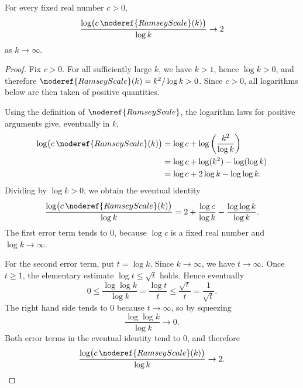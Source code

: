 \begin{helper}
For every fixed real number \(c>0\),
\[
\frac{\log\bigl(c\,\noderef{RamseyScale}(k)\bigr)}{\log k}\to 2
\]
as \(k\to\infty\).
\end{helper}
\begin{proof}
Fix \(c>0\).  For all sufficiently large \(k\), we have \(k>1\), hence
\(\log k>0\), and therefore \(\noderef{RamseyScale}(k)=k^2/\log k>0\).  Since
\(c>0\), all logarithms below are then taken of positive quantities.

Using the definition of \(\noderef{RamseyScale}\), the logarithm laws for
positive arguments give, eventually in \(k\),
\[
\begin{aligned}
\log\bigl(c\,\noderef{RamseyScale}(k)\bigr)
&=\log c+\log\left(\frac{k^2}{\log k}\right)\\
&=\log c+\log(k^2)-\log(\log k)\\
&=\log c+2\log k-\log\log k.
\end{aligned}
\]
Dividing by \(\log k>0\), we obtain the eventual identity
\[
\frac{\log\bigl(c\,\noderef{RamseyScale}(k)\bigr)}{\log k}
=2+\frac{\log c}{\log k}-\frac{\log\log k}{\log k}.
\]
The first error term tends to \(0\), because \(\log c\) is a fixed real number
and \(\log k\to\infty\).

For the second error term, put \(t=\log k\).  Since \(k\to\infty\), we have
\(t\to\infty\).  Once \(t\ge1\), the elementary estimate
\(\log t\le\sqrt t\) holds.  Hence eventually
\[
0\le\frac{\log\log k}{\log k}
=\frac{\log t}{t}
\le\frac{\sqrt t}{t}
=\frac1{\sqrt t}.
\]
The right hand side tends to \(0\) because \(t\to\infty\), so by squeezing
\[
\frac{\log\log k}{\log k}\to0.
\]
Both error terms in the eventual identity tend to \(0\), and therefore
\[
\frac{\log\bigl(c\,\noderef{RamseyScale}(k)\bigr)}{\log k}\to2 .
\]
\end{proof}
